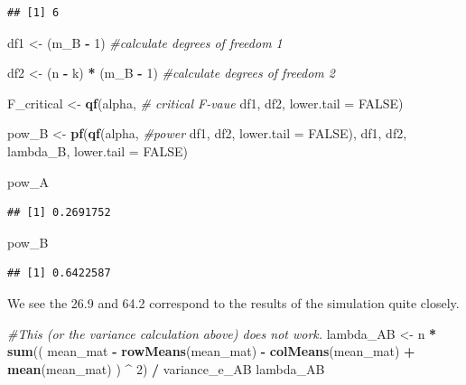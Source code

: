 \documentclass[]{book}
\newenvironment{Shaded}{\begin{snugshade}}{\end{snugshade}}
\newcommand{\CommentTok}[1]{\textcolor[rgb]{0.56,0.35,0.01}{\textit{#1}}}
\newcommand{\DataTypeTok}[1]{\textcolor[rgb]{0.13,0.29,0.53}{#1}}
\newcommand{\DecValTok}[1]{\textcolor[rgb]{0.00,0.00,0.81}{#1}}
\newcommand{\KeywordTok}[1]{\textcolor[rgb]{0.13,0.29,0.53}{\textbf{#1}}}
\newcommand{\NormalTok}[1]{#1}
\newcommand{\OperatorTok}[1]{\textcolor[rgb]{0.81,0.36,0.00}{\textbf{#1}}}
\newcommand{\OtherTok}[1]{\textcolor[rgb]{0.56,0.35,0.01}{#1}}
\newcommand{\StringTok}[1]{\textcolor[rgb]{0.31,0.60,0.02}{#1}}
\begin{document}
\begin{verbatim}
## [1] 6
\end{verbatim}

\begin{Shaded}
\begin{Highlighting}[]
\NormalTok{df1 <-}\StringTok{ }\NormalTok{(m_B }\OperatorTok{-}\StringTok{ }\DecValTok{1}\NormalTok{) }\CommentTok{#calculate degrees of freedom 1}

\NormalTok{df2 <-}\StringTok{ }\NormalTok{(n }\OperatorTok{-}\StringTok{ }\NormalTok{k) }\OperatorTok{*}\StringTok{ }\NormalTok{(m_B }\OperatorTok{-}\StringTok{ }\DecValTok{1}\NormalTok{) }\CommentTok{#calculate degrees of freedom 2}

\NormalTok{F_critical <-}\StringTok{ }\KeywordTok{qf}\NormalTok{(alpha, }\CommentTok{# critical F-vaue}
\NormalTok{                 df1,}
\NormalTok{                 df2,}
                 \DataTypeTok{lower.tail =} \OtherTok{FALSE}\NormalTok{) }

\NormalTok{pow_B <-}\StringTok{ }\KeywordTok{pf}\NormalTok{(}\KeywordTok{qf}\NormalTok{(alpha, }\CommentTok{#power }
\NormalTok{             df1, }
\NormalTok{             df2, }
             \DataTypeTok{lower.tail =} \OtherTok{FALSE}\NormalTok{), }
\NormalTok{          df1, }
\NormalTok{          df2, }
\NormalTok{          lambda_B, }
          \DataTypeTok{lower.tail =} \OtherTok{FALSE}\NormalTok{)}

\NormalTok{pow_A}
\end{Highlighting}
\end{Shaded}

\begin{verbatim}
## [1] 0.2691752
\end{verbatim}

\begin{Shaded}
\begin{Highlighting}[]
\NormalTok{pow_B}
\end{Highlighting}
\end{Shaded}

\begin{verbatim}
## [1] 0.6422587
\end{verbatim}

We see the 26.9 and 64.2 correspond to the results of the simulation quite closely.

\begin{Shaded}
\begin{Highlighting}[]
\CommentTok{#This (or the variance calculation above) does not work.}
\NormalTok{lambda_AB <-}\StringTok{ }\NormalTok{n }\OperatorTok{*}\StringTok{ }\KeywordTok{sum}\NormalTok{((}
\NormalTok{mean_mat }\OperatorTok{-}\StringTok{ }\KeywordTok{rowMeans}\NormalTok{(mean_mat) }\OperatorTok{-}\StringTok{ }\KeywordTok{colMeans}\NormalTok{(mean_mat) }\OperatorTok{+}\StringTok{ }\KeywordTok{mean}\NormalTok{(mean_mat)}
\NormalTok{) }\OperatorTok{^}\StringTok{ }\DecValTok{2}\NormalTok{) }\OperatorTok{/}\StringTok{ }\NormalTok{variance_e_AB}
\NormalTok{lambda_AB}
\end{Highlighting}
\end{Shaded}
\end{document}
